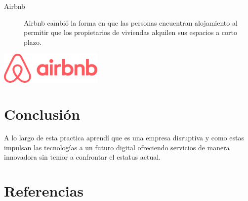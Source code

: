 \documentclass[11pt]{article}
\begin{document}
\begin{description}
\item[{Airbnb}] Airbnb cambió la forma en que las personas encuentran
alojamiento al permitir que los propietarios de viviendas alquilen
sus espacios a corto plazo.
\end{description}

\begin{center}
\includegraphics[width=5cm]{img/Airbnb_Logo_Bélo.svg.png}
\end{center}


\section{Conclusión}
\label{sec:org63c4b3a}
A lo largo de esta practica aprendí que es una empresa disruptiva y
como estas impulsan las tecnologías a un futuro digital ofreciendo
servicios de manera innovadora sin temor a confrontar el estatus actual.

\section{Referencias}
\label{sec:orgd6d2e4b}
\printbibliography[heading=none]
\end{document}
